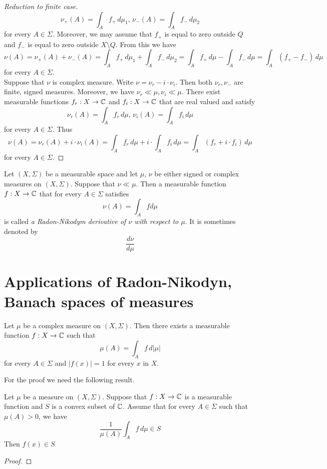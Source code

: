 \begin{proof}[Reduction to finite case]
$$\nu_+(A) = \int_Af_+\,d\mu_1,\,\nu_-(A) = \int_Af_-\,d\mu_2$$
for every $A\in \Sigma$. Moreover, we may assume that $f_+$ is equal to zero outside $Q$ and $f_-$ is equal to zero outside $X\setminus Q$. From this we have
$$\nu(A) = \nu_+(A) + \nu_-(A) = \int_Af_+\,d\mu_1 + \int_Af_-\,d\mu_2 =\int_Af_+\,d\mu - \int_Af_-\,d\mu = \int_A\left(f_+-f_-\right)\,d\mu $$
for every $A\in \Sigma$.\\
Suppose that $\nu$ is complex measure. Write $\nu = \nu_r - i\cdot \nu_i$. Then both $\nu_r, \nu_-$ are finite, signed measures. Moreover, we have $\nu_r\ll\mu,\nu_i\ll \mu$. There exist measurable functions $f_r:X\rightarrow {\mathbb C}$ and $f_i:X\rightarrow {\mathbb C}$ that are real valued and satisfy
$$\nu_r(A) = \int_Af_r\,d\mu,\,\nu_i(A) = \int_Af_i\,d\mu$$
for every $A\in \Sigma$. Thus
$$\nu(A) = \nu_r(A) + i\cdot \nu_i(A) = \int_Af_r\,d\mu + i\cdot \int_Af_i\,d\mu = \int_A\left(f_r+i\cdot f_i\right)\,d\mu$$
for every $A\in \Sigma$.
\end{proof}

\begin{definition}
Let $(X,\Sigma)$ be a measurable space and let $\mu$, $\nu$ be either signed or complex measures on $(X,\Sigma)$. Suppose that $\nu \ll \mu$. Then a measurable function $f:X\rightarrow {\mathbb C}$ that for every $A\in \Sigma$ satisfies
$$\nu(A) = \int_A f d\mu$$
is called \textit{a Radon-Nikodym derivative of $\nu$ with respect to $\mu$}. It is sometimes denoted by 
$$\frac{d\nu}{d\mu}$$
\end{definition}

\section{Applications of Radon-Nikodyn, Banach spaces of measures}

\begin{theorem}
Let $\mu$ be a complex measure on $(X,\Sigma)$. Then there exists a measurable function $f:X\rightarrow {\mathbb C}$ such that
$$\mu(A) = \int_Af\,d|\mu|$$
for every $A\in \Sigma$ and $|f(x)|=1$ for every $x$ in $X$.
\end{theorem}
\noindent
For the proof we need the following result.

\begin{lemma}\label{lemma:convexvaluesofintegral}
Let $\mu$ be a measure on $(X,\Sigma)$. Suppose that $f:X\rightarrow {\mathbb C}$ is a measurable function and $S$ is a convex subset of ${\mathbb C}$. Assume that for every $A\in \Sigma$ such that $\mu(A)>0$, we have
$$\frac{1}{\mu(A)}\int_A f\,d\mu \in S$$
Then $f(x)\in S$ 
\end{lemma}
\begin{proof}

\end{proof}

\small



